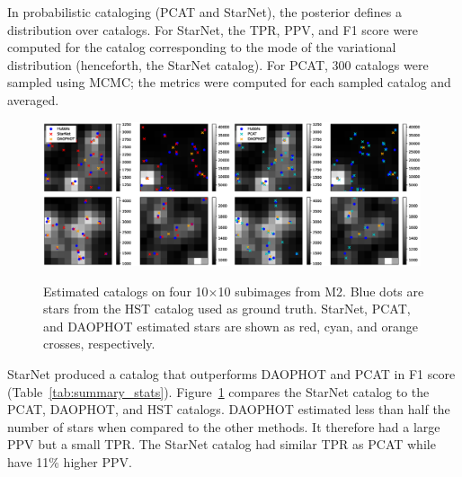 In probabilistic cataloging (PCAT and StarNet), the posterior defines a distribution over catalogs.
For StarNet, the TPR, PPV, and F1 score were computed for the catalog corresponding to the mode of the variational distribution (henceforth, the StarNet catalog).
For PCAT, 300 catalogs were sampled using MCMC; the metrics were computed for each sampled catalog and averaged.

\begin{figure}[tb]
    \centering
    \includegraphics[width=0.49\textwidth]{figures_vg/m2_results/example_subimages_starnet.eps}
    \includegraphics[width=0.49\textwidth]{figures_vg/m2_results/example_subimages_pcat.eps}
    \caption{Estimated catalogs on four 10$\times$10 subimages from
    M2. Blue dots are stars from the HST catalog used as ground truth.
    StarNet, PCAT, and DAOPHOT estimated stars are shown as
    red, cyan, and orange crosses, respectively. }
    \label{fig:example_subimages}
\end{figure}

StarNet produced a catalog that outperforms DAOPHOT and PCAT in F1 score (Table~\ref{tab:summary_stats}).
Figure~\ref{fig:example_subimages} compares the StarNet catalog to the PCAT, DAOPHOT, and HST catalogs.
DAOPHOT estimated less than half the number of stars when compared to the other methods.
It therefore had a large PPV but a small TPR.
The StarNet catalog had similar TPR as PCAT while have 11\% higher PPV.


